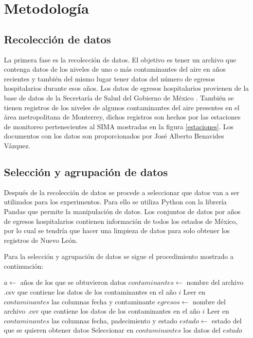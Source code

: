 \section{Metodología}

\subsection{Recolección de datos}
La primera fase es la recolección de datos. El objetivo es tener un archivo que contenga datos de los niveles de uno o más  contaminantes del aire en años recientes y también del mismo lugar tener datos del número de egresos hospitalarios durante esos años. Los datos de egresos hospitalarios provienen de la base de datos de la Secretaría de Salud del Gobierno de México \cite{f1}. También se tienen registros de los niveles de algunos contaminantes del aire presentes en el área metropolitana de Monterrey, dichos registros son hechos por las estaciones de monitoreo pertenecientes al SIMA \cite{f2} mostradas en la figura \ref{estaciones}. Los documentos con los datos son proporcionados por José Alberto Benavides Vázquez.

\subsection{Selección y agrupación de datos}
Después de la recolección de datos se procede a seleccionar que datos van a ser utilizados para los experimentos. Para ello se utiliza Python con la librería Pandas que permite la manipulación de datos. Los conjuntos de datos por años de egresos hospitalarios contienen información de todos los estados de México, por lo cual se tendría que hacer una limpieza de datos para solo obtener los registros de Nuevo León.

Para la selección y agrupación de datos se sigue el procedimiento mostrado a continuación:

\begin{algorithmic}[1]
\State $a \leftarrow $ años de los que se obtuvieron datos
    \State $contaminantes \leftarrow $ nombre del archivo .csv que contiene los datos de los contaminantes en el año $i$
    \State Leer en $contaminantes$ las columnas fecha y contaminante 
    \State $egresos \leftarrow $ nombre del archivo .csv que contiene los datos de los contaminantes en el año $i$
    \State Leer en $contaminantes$ las columnas fecha, padecimiento y estado
    \State $estado \leftarrow $ estado del que se quieren obtener datos
    \State Seleccionar en $contaminantes$ los datos del $estado$
\EndFor
\end{algorithmic} 

